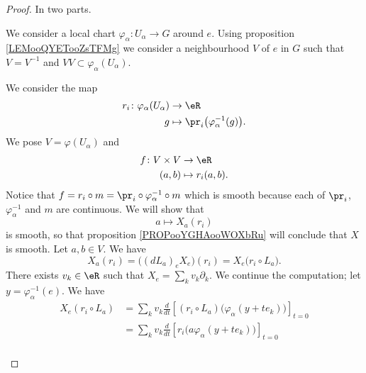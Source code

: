 \begin{proof}
	In two parts.
	\begin{subproof}
		\spitem[In a neighbourhood of \( e\)]
		We consider a local chart \(\varphi_{\alpha} \colon U_{\alpha}\to G  \) around \( e\). Using proposition \ref{LEMooQYETooZsTFMg} we consider a neighbourhood \( V\) of \( e\) in \( G\) such that \( V=V^{-1}\) and \( VV\subset\varphi_{\alpha}(U_{\alpha})\).

		We consider the map
		\begin{equation}
			\begin{aligned}
				r_i\colon \varphi_{\alpha}(U_{\alpha}) & \to  \eR                                           \\
				g                                      & \mapsto \pr_i\big( \varphi_{\alpha}^{-1}(g) \big).
			\end{aligned}
		\end{equation}
		We pose \( V=\varphi(U_{\alpha}) \) and
		\begin{equation}
			\begin{aligned}
				f\colon V\times V & \to \eR           \\
				(a,b)             & \mapsto r_i(a,b).
			\end{aligned}
		\end{equation}
		Notice that \( f=r_i\circ m=\pr_i\circ\varphi_{\alpha}^{-1}\circ m\) which is smooth because each of \( \pr_i\), \( \varphi_{\alpha}^{-1}\) and \( m\) are continuous. We will show that
		\begin{equation}
			a\mapsto X_a(r_i)
		\end{equation}
		is smooth, so that proposition \ref{PROPooYGHAooWOXbRu} will conclude that \( X\) is smooth. Let \( a,b\in V\). We have
		\begin{equation}
			X_a(r_i)=\big( (dL_a)_eX_e \big)(r_i)=X_e\big( r_i\circ L_a \big).
		\end{equation}
		There exists \( v_k\in \eR\) such that \( X_e=\sum_kv_k\partial_k\). We continue the computation; let \( y=\varphi_{\alpha}^{-1}(e)\). We have
		\begin{subequations}
			\begin{align}
				X_e(r_i\circ L_a) & =\sum_kv_k\frac{d}{dt} \left[ (r_i\circ L_a)\big( \varphi_{\alpha}(y+te_k) \big)  \right]_{t=0} \\
				                  & =\sum_kv_k\frac{d}{dt} \left[ r_i\big( a\varphi_{\alpha}(y+te_k) \big)  \right]_{t=0}           \\

\end{align}
\end{subequations}
\end{subproof}
\end{proof}
